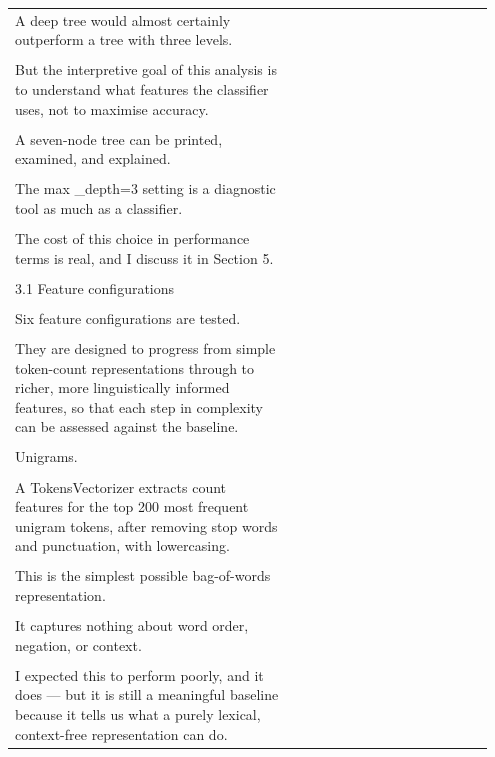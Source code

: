 \documentclass[11pt]{article}
\begin{document}
\begin{longtable}{|p{0.55\linewidth}|p{0.40\linewidth}|}
\hline
\rule{0pt}{3.5cm} & \\
\hline
A deep tree would almost certainly outperform a tree with three levels. & \\[2pt]
\hline
\rule{0pt}{3.5cm} & \\
\hline
But the interpretive goal of this analysis is to understand what features the classifier uses, not to maximise accuracy. & \\[2pt]
\hline
\rule{0pt}{3.5cm} & \\
\hline
A seven-node tree can be printed, examined, and explained. & \\[2pt]
\hline
\rule{0pt}{3.5cm} & \\
\hline
The max \_depth=3 setting is a diagnostic tool as much as a classifier. & \\[2pt]
\hline
\rule{0pt}{3.5cm} & \\
\hline
The cost of this choice in performance terms is real, and I discuss it in Section 5. & \\[2pt]
\hline
\rule{0pt}{3.5cm} & \\
\hline
3.1 Feature configurations & \\[2pt]
\hline
\rule{0pt}{3.5cm} & \\
\hline
Six feature configurations are tested. & \\[2pt]
\hline
\rule{0pt}{3.5cm} & \\
\hline
They are designed to progress from simple token-count representations through to richer, more linguistically informed features, so that each step in complexity can be assessed against the baseline. & \\[2pt]
\hline
\rule{0pt}{3.5cm} & \\
\hline
Unigrams. & \\[2pt]
\hline
\rule{0pt}{3.5cm} & \\
\hline
A TokensVectorizer extracts count features for the top 200 most frequent unigram tokens, after removing stop words and punctuation, with lowercasing. & \\[2pt]
\hline
\rule{0pt}{3.5cm} & \\
\hline
This is the simplest possible bag-of-words representation. & \\[2pt]
\hline
\rule{0pt}{3.5cm} & \\
\hline
It captures nothing about word order, negation, or context. & \\[2pt]
\hline
\rule{0pt}{3.5cm} & \\
\hline
I expected this to perform poorly, and it does --- but it is still a meaningful baseline because it tells us what a purely lexical, context-free representation can do. & \\[2pt]

\end{longtable}
\end{document}
